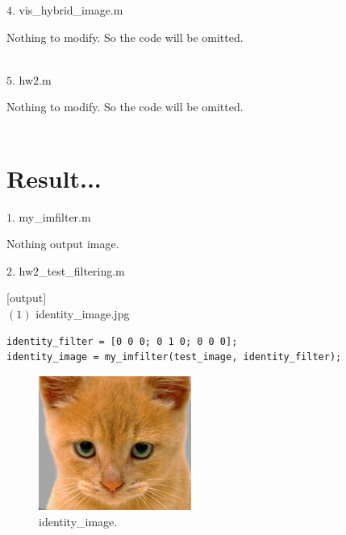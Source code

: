 {\large $4.$ vis\_hybrid\_image.m \par}
\tab Nothing to modify. So the code will be omitted.\\\\


{\large $5.$ hw$2$.m  \par}
\tab Nothing to modify. So the code will be omitted.\\\\

\pagebreak
\section*{Result...}  

{\large $1.$ my\_imfilter.m \par}
\tab Nothing output image.

{\large $2.$ hw$2$\_test\_filtering.m \par}
[output] \\
$(1)$ identity\_image.jpg
\begin{lstlisting}[style=Matlab-editor]
identity_filter = [0 0 0; 0 1 0; 0 0 0];
identity_image = my_imfilter(test_image, identity_filter);
\end{lstlisting}
\begin{figure}[!h]
    \centering
    \includegraphics[width=5cm]{identity_image.jpg}
    \caption{identity\_image.}
    \label{fig:result1}
\end{figure}

